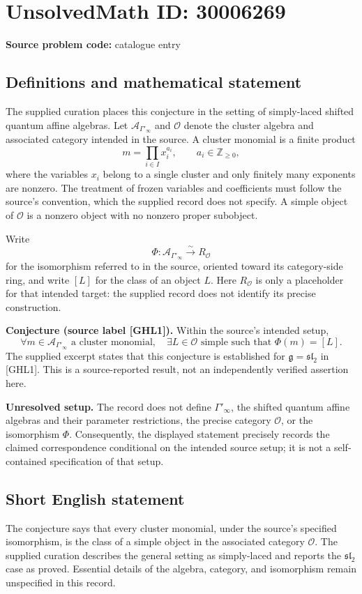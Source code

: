 \documentclass[11pt]{article}
\newcommand{\Z}{\mathbb{Z}}
\begin{document}
\section*{UnsolvedMath ID: 30006269}
\textbf{Source problem code:} catalogue entry
\subsection{Definitions and mathematical statement}
The supplied curation places this conjecture in the setting of simply-laced shifted quantum affine algebras. Let \(\mathcal A_{\Gamma'_\infty}\) and \(\mathcal O\) denote the cluster algebra and associated category intended in the source. A cluster monomial is a finite product
\[
 m=\prod_{i\in I}x_i^{a_i},\qquad a_i\in\Z_{\geq 0},
\]
where the variables \(x_i\) belong to a single cluster and only finitely many exponents are nonzero. The treatment of frozen variables and coefficients must follow the source's convention, which the supplied record does not specify. A simple object of \(\mathcal O\) is a nonzero object with no nonzero proper subobject.

Write
\[
 \Phi:\mathcal A_{\Gamma'_\infty}\xrightarrow{\sim}R_{\mathcal O}
\]
for the isomorphism referred to in the source, oriented toward its category-side ring, and write \([L]\) for the class of an object \(L\). Here \(R_{\mathcal O}\) is only a placeholder for that intended target: the supplied record does not identify its precise construction.

\textbf{Conjecture (source label [GHL1]).} Within the source's intended setup,
\[
 \forall m\in\mathcal A_{\Gamma'_\infty}\text{ a cluster monomial},\quad
 \exists L\in\mathcal O\text{ simple such that }\Phi(m)=[L].
\]
The supplied excerpt states that this conjecture is established for \(\mathfrak g=\mathfrak{sl}_2\) in [GHL1]. This is a source-reported result, not an independently verified assertion here.

\textbf{Unresolved setup.} The record does not define \(\Gamma'_\infty\), the shifted quantum affine algebras and their parameter restrictions, the precise category \(\mathcal O\), or the isomorphism \(\Phi\). Consequently, the displayed statement precisely records the claimed correspondence conditional on the intended source setup; it is not a self-contained specification of that setup.
\subsection{Short English statement}
The conjecture says that every cluster monomial, under the source's specified isomorphism, is the class of a simple object in the associated category \(\mathcal O\). The supplied curation describes the general setting as simply-laced and reports the \(\mathfrak{sl}_2\) case as proved. Essential details of the algebra, category, and isomorphism remain unspecified in this record.
\end{document}
